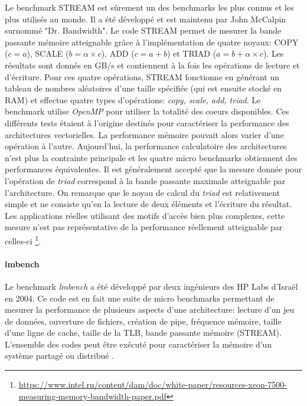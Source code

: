         
            Le benchmark STREAM est sûrement un des benchmarks les plus connus et les plus utilisés au monde. Il a été développé et est maintenu par John McCalpin surnommé "Dr. Bandwidth". Le code STREAM permet de mesurer la bande passante mémoire atteignable grâce à l'implémentation de quatre noyaux: COPY ($c=a$), SCALE ($b=\alpha \times c$), ADD ($c=a+b$) et TRIAD ($a=b+\alpha \times c$). Les résultats sont donnés en GB/s et contiennent à la fois les opérations de lecture et d'écriture. Pour ces quatre opérations, STREAM fonctionne en générant un tableau de nombres aléatoires d'une taille spécifiée (qui est ensuite stocké en RAM) et effectue quatre types d'opérations: \textit{copy, scale, add, triad}.  Le benchmark utilise \textit{OpenMP} pour utiliser la totalité des coeurs disponibles. Ces différents tests étaient à l'origine destinés pour caractériser la performance des architectures vectorielles. La performance mémoire pouvait alors varier d'une opération à l'autre. Aujourd'hui, la performance calculatoire des architectures n'est plus la contrainte principale et les quatre micro benchmarks obtiennent des performances équivalentes. Il est généralement accepté que la mesure donnée pour l'opération de \textit{triad} correspond à la bande passante maximale atteignable par l'architecture. On remarque que le noyau de calcul du \textit{triad} est relativement simple et ne consiste qu'en la lecture de deux éléments et l'écriture du résultat. Les applications réelles utilisant des motifs d'accès bien plus complexes, cette mesure n'est pas représentative de la performance réellement atteignable par celles-ci \footnote{\url{https://www.intel.ru/content/dam/doc/white-paper/resources-xeon-7500-measuring-memory-bandwidth-paper.pdf}}.
            
       
        \paragraph{lmbench \cite{Staelin2004}} 
            
            
            Le benchmark \textit{lmbench}\cite{Staelin2004} a été développé par deux ingénieurs des HP Labs d'Israël en 2004. Ce code est en fait une suite de micro benchmarks permettant de mesurer la performance de plusieurs aspects d'une architecture: lecture d'un jeu de données, ouverture de fichiers, création de pipe, fréquence mémoire, taille d'une ligne de cache, taille de la TLB, bande passante mémoire (STREAM). L'ensemble des codes peut être exécuté pour caractériser la mémoire d'un système partagé ou distribué \cite{Staelin2002}.
            
